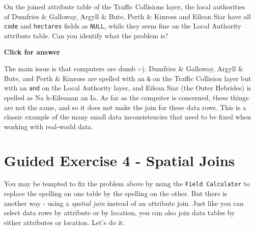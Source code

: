 \documentclass[
  letterpaper,
  DIV=11,
  numbers=noendperiod]{scrreprt}
\begin{document}
\begin{tcolorbox}[enhanced jigsaw, breakable, toptitle=1mm, colback=white, left=2mm, leftrule=.75mm, titlerule=0mm, colframe=quarto-callout-important-color-frame, opacityback=0, title=\textcolor{quarto-callout-important-color}{\faExclamation}\hspace{0.5em}{Stop and Think}, toprule=.15mm, opacitybacktitle=0.6, bottomtitle=1mm, colbacktitle=quarto-callout-important-color!10!white, bottomrule=.15mm, coltitle=black, rightrule=.15mm, arc=.35mm]

On the joined attribute table of the Traffic Collisions layer, the local
authorities of Dumfries \& Galloway, Argyll \& Bute, Perth \& Kinross
and Eilean Siar have all \texttt{code} and \texttt{hectares} fields as
\texttt{NULL}, while they seem fine on the Local Authority attribute
table. Can you identify what the problem is?

\end{tcolorbox}

\begin{tcolorbox}[enhanced jigsaw, leftrule=.75mm, colframe=quarto-callout-important-color-frame, breakable, toprule=.15mm, bottomrule=.15mm, arc=.35mm, rightrule=.15mm, opacityback=0, colback=white, left=2mm]

\vspace{-3mm}\textbf{Click for answer}\vspace{3mm}

The main issue is that computers are dumb :-). Dumfries \& Galloway,
Argyll \& Bute, and Perth \& Kinross are spelled with an \texttt{\&} on
the Traffic Collision layer but with an \texttt{and} on the Local
Authority layer, and Eilean Siar (the Outer Hebrides) is spelled as Na
h-Eileanan an Ia. As far as the computer is concerned, these things are
not the same, and so it does not make the join for these data rows. This
is a classic example of the many small data inconsistencies that need to
be fixed when working with real-world data.

\end{tcolorbox}

\section{Guided Exercise 4 - Spatial
Joins}\label{guided-exercise-4---spatial-joins}

You may be tempted to fix the problem above by using the
\texttt{Field\ Calculator} to replace the spelling on one table by the
spelling on the other. But there is another way - using a \emph{spatial
join} instead of an attribute join. Just like you can select data rows
by attribute or by location, you can also join data tables by either
attributes or location. Let's do it.
\end{document}
